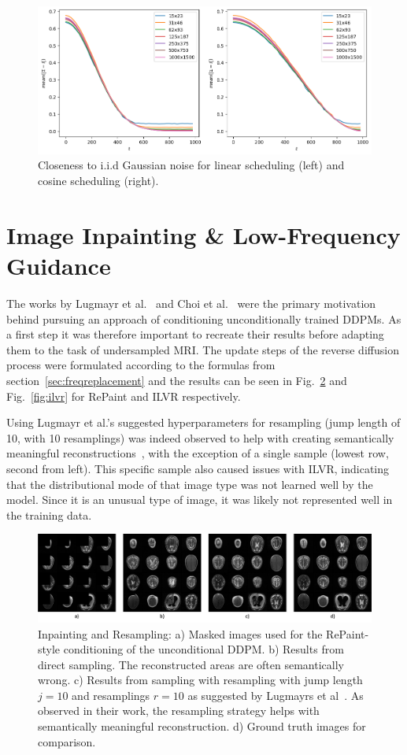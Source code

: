 \begin{figure}[h]
    \centering
    \includegraphics[width=.7\textwidth]{images/frobenius_norm.png}
    \caption{Closeness to i.i.d Gaussian noise for linear scheduling (left) and cosine scheduling (right).}
    \label{fig:noisecloseness}
\end{figure}

\section{Image Inpainting \& Low-Frequency Guidance}
The works by Lugmayr et al.~\autocite{lugmayr2022repaint} and Choi et al.~\autocite{choi2021ilvr} were the primary motivation behind pursuing an approach of conditioning unconditionally trained DDPMs. As a first step it was therefore important to recreate their results before adapting them to the task of undersampled MRI. The update steps of the reverse diffusion process were formulated according to the formulas from section~\ref{sec:freqreplacement} and the results can be seen in Fig.~\ref{fig:repaint} and Fig.~\ref{fig:ilvr} for RePaint and ILVR respectively.

Using Lugmayr et al.'s suggested hyperparameters for resampling (jump length of 10, with 10 resamplings) was indeed observed to help with creating semantically meaningful reconstructions~\autocite{lugmayr2022repaint}, with the exception of a single sample (lowest row, second from left). This specific sample also caused issues with ILVR, indicating that the distributional mode of that image type was not learned well by the model. Since it is an unusual type of image, it was likely not represented well in the training data.

\begin{figure}[h]
    \centering
    \includegraphics[width=.8\textwidth]{images/repaint.png}
    \caption[Inpainting and Resampling]{Inpainting and Resampling: a) Masked images used for the RePaint-style conditioning of the unconditional DDPM. b) Results from direct sampling. The reconstructed areas are often semantically wrong. c) Results from sampling with resampling with jump length $j=10$ and resamplings $r=10$ as suggested by Lugmayrs et al~\autocite{lugmayr2022repaint}. As observed in their work, the resampling strategy helps with semantically meaningful reconstruction. d) Ground truth images for comparison.}
    \label{fig:repaint}
\end{figure}

